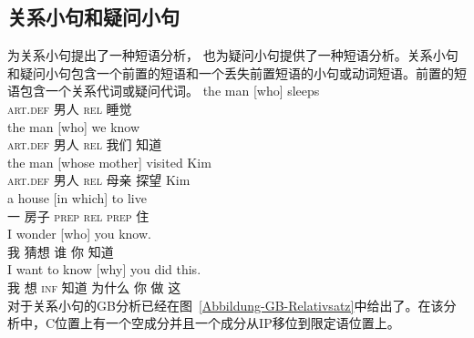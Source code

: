 \begin{exe}
\begin{xlist}[iv.]
\begin{exe}
\begin{xlist}[iv.]
\subsection{关系小句和疑问小句}
\label{Abschnitt-Relativ-Interrogativsaetze}
\mbox{} \citet{Sag97a}为关系小句提出了一种短语分析， \citet{GSag2000a-u}也为疑问小句提供了一种短语分析。关系小句和疑问小句包含一个前置的短语和一个丢失前置短语的小句或动词短语。前置的短语包含一个关系代词或疑问代词。
\eal
\ex
\gll the man [who] sleeps\\
     \textsc{art}.\textsc{def} 男人 \spacebr{}\textsc{rel} 睡觉\\
\ex
\gll the man [who] we know\\
     \textsc{art}.\textsc{def} 男人 \spacebr{}\textsc{rel} 我们 知道\\
\ex
\gll the man [whose mother] visited Kim\\
     \textsc{art}.\textsc{def} 男人 \spacebr{}\textsc{rel} 母亲 探望 Kim\\
\ex
\gll a house [in which] to live\\
     一 房子 \spacebr{}\textsc{prep} \textsc{rel} \textsc{prep} 住\\
\zl
\eal
\ex
\gll I wonder [who] you know.\\
     我 猜想 \spacebr{}谁 你 知道\\
\ex
\gll  I want to know [why] you did this.\\
     我 想 \textsc{inf} 知道 \spacebr{}为什么 你 做 这\\
\zl
对于关系小句的GB分析已经在图~\ref{Abbildung-GB-Relativsatz}中给出了。在该分析中，C位置上有一个空成分并且一个成分从IP移位到限定语位置上。%

\end{xlist}
\end{exe}
\end{xlist}
\end{exe}
